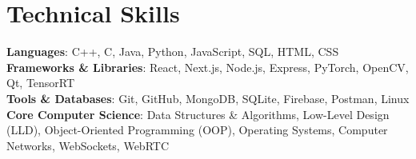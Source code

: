 \documentclass[letterpaper,10pt]{article}
\begin{document}
\section{Technical Skills}
 \begin{itemize}[leftmargin=0.15in, label={}]
    \small{\item{
     \textbf{Languages}{: C++, C, Java, Python, JavaScript, SQL, HTML, CSS} \\
     \textbf{Frameworks \& Libraries}{: React, Next.js, Node.js, Express, PyTorch, OpenCV, Qt, TensorRT} \\
     \textbf{Tools \& Databases}{: Git, GitHub, MongoDB, SQLite, Firebase, Postman, Linux} \\
     \textbf{Core Computer Science}{: Data Structures \& Algorithms, Low-Level Design (LLD), Object-Oriented Programming (OOP), Operating Systems, Computer Networks, WebSockets, WebRTC}
    }}
 \end{itemize}
\end{document}
